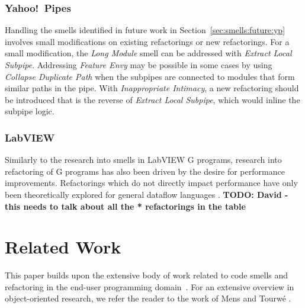 \documentclass[10pt,conference,compsocconf]{IEEEtran}
\newcommand{\todo}[1]{\textbf{TODO: #1}}
\begin{document}
\subsubsection{Yahoo!\ Pipes}
Handling the smells identified in future work in Section~\ref{sec:smells:future:yp} involves small modifications on existing refactorings or new refactorings. For a small modification, the \emph{Long Module} smell can be addressed with \emph{Extract Local Subpipe}. 
Addressing \emph{Feature Envy} may be possible in some cases by using \emph{Collapse Duplicate Path} when the subpipes are connected to modules that form similar paths in the pipe.
With \emph{Inappropriate Intimacy}, a new refactoring should be introduced that is the reverse of \emph{Extract Local Subpipe}, which would inline the subpipe logic. 


\subsubsection{LabVIEW}

Similarly to the research into smells in LabVIEW G programs, research into refactoring of G programs has also been driven by the desire for performance improvements. Refactorings which do not directly impact performance have only been theoretically explored for general dataflow languages \cite{sui2008automated}.
\todo{David - this needs to talk about all the * refactorings in the table}


\section{Related Work}
\label{sec:related_work}

This paper builds upon the extensive body of work related to code smells and refactoring in the end-user programming domain~\cite{Stolee2015, Stolee2011, StoleeTSE2013, Hermans2011, Hermans2012intra, Hermans2012inter, hermans2014bumblebee, chambers2013smell, chambers2015impact}. For an extensive overview in object-oriented research, we refer the reader to the work of Mens and Tourw\'{e} \cite{mens2004survey}.
\end{document}
